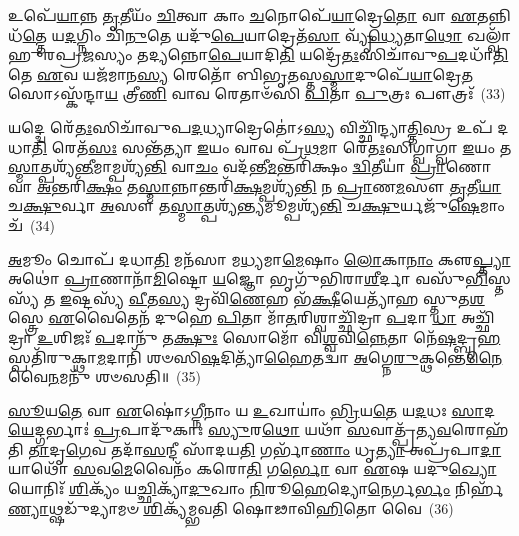 𑌉𑌪𑍇᳴\-\ul{𑌯𑌾}\-𑌨𑍍𑌨 \ul{𑌤𑍃}\-𑌤𑍀𑌯𑌂᳴ \ul{𑌚𑌿}\-𑌤𑍍𑌵𑌾 𑌕𑌾𑌂 \ul{𑌚}\-𑌨𑍋𑌪𑍇᳴\-\ul{𑌯𑌾}\-𑌦𑍍𑌰𑍇\-\ul{𑌤𑍋} 𑌵𑌾 \ul{𑌏}\-𑌤𑌨𑍍𑌨𑌿 𑌧᳴\-\ul{𑌤𑍍𑌤𑍇} 𑌯\-\ul{𑌦}\-𑌗𑍍𑌨𑌿𑌂 𑌚𑌿᳴\-\ul{𑌨𑍁}\-𑌤𑍇 𑌯𑌦𑍁᳴\-\ul{𑌪𑍇}\-𑌯𑌾𑌦𑍍𑌰𑍇𑌤᳴\-\ul{𑌸𑌾} 𑌵𑍍𑌯𑍃᳴\-\ul{𑌧𑍍𑌯𑍇}\-𑌤𑌾\-\ul{𑌥𑍋} 𑌖𑌲𑍍𑌵𑌾᳴𑌹𑍁𑌰𑌪𑍍𑌰\-\ul{𑌜}\-𑌸𑍍𑌯𑌂 𑌤𑌦𑍍𑌯𑌨𑍍𑌨𑍋\-\ul{𑌪𑍇}\-𑌯𑌾𑌦𑌿\-\ul{𑌤𑌿} 𑌯𑌦𑍍𑌰𑍇᳴\-\ul{𑌤𑌃}\-𑌸𑌿𑌚𑌾᳴𑌵𑍁\-\ul{𑌪}\-𑌦𑌧𑌾᳴\-\ul{𑌤𑌿} 𑌤𑍇 \ul{𑌏}\-𑌵 𑌯𑌜᳴𑌮𑌾𑌨\-\ul{𑌸𑍍𑌯} 𑌰𑍇𑌤𑍋᳴ 𑌬𑌿𑌭𑍃\-\ul{𑌤}\-𑌸𑍍𑌤\-\ul{𑌸𑍍𑌮𑌾}\-𑌦𑍁𑌪𑍇᳴\-\ul{𑌯𑌾}\-𑌦𑍍𑌰𑍇\-\ul{𑌤}\-𑌸𑍋\-𑌽𑌸𑍍𑌕᳴𑌨𑍍𑌦𑌾\-\ul{𑌯} 𑌤𑍍𑌰𑍀\-\ul{𑌣𑌿} 𑌵𑌾𑌵 𑌰𑍇𑌤𑌾𑍞᳴𑌸𑌿 \ul{𑌪𑌿}\-𑌤𑌾 \ul{𑌪𑍁}\-𑌤𑍍𑌰𑌃 𑌪𑍗𑌤𑍍𑌰𑌃᳴~(33)

𑌯𑌦𑍍𑌦𑍍𑌵𑍇 𑌰𑍇᳴\-\ul{𑌤𑌃}\-𑌸𑌿𑌚𑌾᳴𑌵𑍁𑌪\-\ul{𑌦}\-𑌧𑍍𑌯𑌾𑌦𑍍𑌰𑍇𑌤𑍋॑\-𑌽\-\ul{𑌸𑍍𑌯} 𑌵𑌿𑌚𑍍𑌛𑌿᳴𑌨𑍍𑌦𑍍𑌯𑌾\-\ul{𑌤𑍍𑌤𑌿}\-𑌸𑍍𑌰 𑌉𑌪᳴ 𑌦𑌧𑌾\-\ul{𑌤𑌿} 𑌰𑍇𑌤᳴\-\ul{𑌸𑌃} 𑌸𑌨𑍍𑌤᳴𑌤𑍍𑌯𑌾 \ul{𑌇}\-𑌯𑌂 𑌵𑌾𑌵 𑌪𑍍𑌰᳴\-\ul{𑌥}\-𑌮𑌾 𑌰𑍇᳴\-\ul{𑌤𑌃}\-𑌸𑌿𑌗𑍍𑌵𑌾𑌗𑍍𑌵𑌾 \ul{𑌇}\-𑌯𑌂 𑌤\-\ul{𑌸𑍍𑌮𑌾}\-𑌤𑍍𑌪𑌶𑍍𑌯᳴\-\ul{𑌨𑍍𑌤𑍀}\-𑌮𑌾𑌮𑍍𑌪𑌶𑍍𑌯᳴\-\ul{𑌨𑍍𑌤𑌿} 𑌵𑌾\-\ul{𑌚𑌂} 𑌵𑌦᳴𑌨𑍍𑌤𑍀\-\ul{𑌮}\-𑌨𑍍𑌤𑌰𑌿᳴𑌕𑍍𑌷𑌂 \ul{𑌦𑍍𑌵𑌿}\-𑌤𑍀𑌯𑌾॑ \ul{𑌪𑍍𑌰𑌾}\-𑌣𑍋 𑌵𑌾 \ul{𑌅}\-𑌨𑍍𑌤𑌰𑌿᳴\-\ul{𑌕𑍍𑌷𑌂} 𑌤\-\ul{𑌸𑍍𑌮𑌾}\-𑌨𑍍𑌨𑌾𑌨𑍍𑌤𑌰𑌿᳴\-\ul{𑌕𑍍𑌷}\-𑌮𑍍𑌪𑌶𑍍𑌯᳴\-\ul{𑌨𑍍𑌤𑌿} 𑌨 \ul{𑌪𑍍𑌰𑌾}\-𑌣\-\ul{𑌮}\-𑌸𑍗 \ul{𑌤𑍃}\-𑌤𑍀\-\ul{𑌯𑌾} 𑌚\-\ul{𑌕𑍍𑌷𑍁}\-𑌰𑍍𑌵𑌾 \ul{𑌅}\-𑌸𑍗 𑌤\-\ul{𑌸𑍍𑌮𑌾}\-𑌤𑍍𑌪𑌶𑍍𑌯᳴\-\ul{𑌨𑍍𑌤𑍍𑌯}\-𑌮𑍂𑌮𑍍𑌪𑌶𑍍𑌯᳴\-\ul{𑌨𑍍𑌤𑌿} 𑌚\-\ul{𑌕𑍍𑌷𑍁}\-𑌰𑍍𑌯𑌜𑍁᳴\-\ul{𑌷𑍇}\-𑌮𑌾𑌂 𑌚᳴~(34)

\-\ul{𑌅}\-𑌮𑍂𑌂 𑌚𑍋𑌪᳴ 𑌦𑌧𑌾\-\ul{𑌤𑌿} 𑌮𑌨᳴𑌸𑌾 𑌮\-\ul{𑌧𑍍𑌯}\-𑌮𑌾\-\ul{𑌮𑍇}\-𑌷𑌾𑌂 \ul{𑌲𑍋}\-𑌕𑌾\-\ul{𑌨𑌾𑌂} 𑌕𑍢\-\ul{𑌪𑍍𑌤𑍍𑌯𑌾} 𑌅𑌥𑍋॑ \ul{𑌪𑍍𑌰𑌾}\-𑌣𑌾𑌨𑌾᳴\-\ul{𑌮𑌿}\-𑌷𑍍𑌟𑍋 \ul{𑌯}\-𑌜𑍍𑌞𑍋 𑌭𑍃𑌗𑍁᳴𑌭𑌿𑌰𑌾\-\ul{𑌶𑍀}\-𑌰𑍍𑌦𑌾 𑌵𑌸𑍁᳴\-\ul{𑌭𑌿}\-𑌸𑍍𑌤𑌸𑍍𑌯᳴ 𑌤 \ul{𑌇}\-𑌷𑍍𑌟𑌸𑍍𑌯᳴ \ul{𑌵𑍀}\-𑌤\-\ul{𑌸𑍍𑌯} 𑌦𑍍𑌰𑌵𑌿᳴\-\ul{𑌣𑍇}\-𑌹 𑌭᳴\-\ul{𑌕𑍍𑌷𑍀}\-𑌯𑍇𑌤𑍍𑌯𑌾᳴𑌹 𑌸𑍍𑌤𑍁𑌤\-\ul{𑌶}\-𑌸𑍍𑌤𑍍𑌰𑍇 \ul{𑌏}\-𑌵𑍈𑌤𑍇𑌨᳴ 𑌦𑍁𑌹𑍇 \ul{𑌪𑌿}\-𑌤𑌾 𑌮𑌾᳴\-\ul{𑌤}\-𑌰𑌿𑌶𑍍𑌵𑌾𑌚𑍍𑌛𑌿᳴𑌦𑍍𑌰𑌾 \ul{𑌪}\-𑌦𑌾 \ul{𑌧𑌾} 𑌅𑌚𑍍𑌛𑌿᳴𑌦𑍍𑌰𑌾 \ul{𑌉}\-𑌶𑌿𑌜𑌃᳴ \ul{𑌪}\-𑌦𑌾𑌨𑍁᳴ 𑌤\-\ul{𑌕𑍍𑌷𑍁𑌃} 𑌸𑍋𑌮𑍋᳴ 𑌵𑌿\-\ul{𑌶𑍍𑌵}\-𑌵𑌿\-\ul{𑌨𑍍𑌨𑍇}\-𑌤𑌾 𑌨𑍇᳴\-\ul{𑌷}\-𑌦𑍍𑌬𑍃\-\ul{𑌹}\-𑌸𑍍𑌪𑌤𑌿᳴𑌰𑍁𑌕𑍍𑌥𑌾\-\ul{𑌮}\-𑌦𑌾𑌨𑌿᳴ 𑌶𑍞𑌸𑌿\-\ul{𑌷}\-𑌦𑌿𑌤𑍍𑌯𑌾᳴\-\ul{𑌹𑍈}\-𑌤𑌦𑍍𑌵𑌾 \ul{𑌅}\-𑌗𑍍𑌨𑍇\-\ul{𑌰𑍁}\-𑌕𑍍𑌥𑌨𑍍𑌤𑍇\-\ul{𑌨𑍈}\-𑌵𑍈\-\ul{𑌨}\-𑌮𑌨𑍁᳴ 𑌶𑍞𑌸𑌤𑌿॥~(35)

{\anuvakamend[{\-\ul{𑌮𑌿}\-\-\ul{𑌨𑍁}\-𑌯𑌾\-\ul{𑌤𑍍𑌤𑍃}\-𑌤𑍀𑌯𑌂᳴ 𑌚𑌿\-\ul{𑌨𑍍𑌵𑌾}\-𑌨𑌸𑍍𑌤𑍍𑌰𑌿\-\ul{𑌯𑌂} 𑌪𑍗𑌤𑍍𑌰᳴\-\ul{𑌶𑍍𑌚} 𑌵𑍈 \ul{𑌸}\-𑌪𑍍𑌤𑌦᳴𑌶 𑌚}]}%

\-\ul{𑌸𑍂}\-𑌯\-\ul{𑌤𑍇} 𑌵𑌾 \ul{𑌏}\-𑌷𑍋॑\-𑌽\-\ul{𑌗𑍍𑌨𑍀}\-𑌨𑌾𑌂 𑌯 \ul{𑌉}\-𑌖𑌾𑌯𑌾𑌂॑ \ul{𑌭𑍍𑌰𑌿}\-𑌯\-\ul{𑌤𑍇} 𑌯\-\ul{𑌦}\-𑌧𑌃 \ul{𑌸𑌾}\-𑌦\-\ul{𑌯𑍇}\-𑌦𑍍𑌗𑌰𑍍𑌭𑌾𑌃॑ \ul{𑌪𑍍𑌰}\-𑌪𑌾𑌦𑍁᳴𑌕𑌾𑌃 \ul{𑌸𑍍𑌯𑍁}\-𑌰\-\ul{𑌥𑍋} 𑌯𑌥𑌾᳴ \ul{𑌸}\-𑌵𑌾𑌤𑍍𑌪𑍍𑌰᳴𑌤𑍍𑌯\-\ul{𑌵}\-𑌰𑍋𑌹᳴𑌤𑌿 \ul{𑌤𑌾}\-𑌦𑍃\-\ul{𑌗𑍇}\-𑌵 𑌤𑌦𑌾᳴\-\ul{𑌸}\-𑌨𑍍𑌦𑍀 𑌸𑌾᳴𑌦𑌯\-\ul{𑌤𑌿} 𑌗𑌰𑍍𑌭𑌾᳴\-\ul{𑌣𑌾𑌂} 𑌧𑍃\-\ul{𑌤𑍍𑌯𑌾} 𑌅𑌪𑍍𑌰᳴𑌪𑌾\-\ul{𑌦𑌾}\-𑌯𑌾𑌥𑍋᳴ \ul{𑌸}\-𑌵\-\ul{𑌮𑍇}\-𑌵𑍈𑌨𑌂᳴ 𑌕𑌰𑍋\-\ul{𑌤𑌿} 𑌗\-\ul{𑌰𑍍𑌭𑍋} 𑌵𑌾 \ul{𑌏}\-𑌷 𑌯𑌦𑍁\-\ul{𑌖𑍍𑌯𑍋} 𑌯𑍋𑌨𑌿𑌃᳴ \ul{𑌶𑌿}\-𑌕𑍍𑌯𑌂᳴ 𑌯\-\ul{𑌚𑍍𑌛𑌿}\-𑌕𑍍𑌯𑌾᳴\-\ul{𑌦𑍁}\-𑌖𑌾𑌂 \ul{𑌨𑌿}\-𑌰𑍂\-\ul{𑌹𑍇}\-𑌦𑍍𑌯𑍋\-\ul{𑌨𑍇}\-𑌰𑍍𑌗\-\ul{𑌰𑍍𑌭𑌂} 𑌨𑌿𑌰𑍍\mbox{}𑌹᳴\-\ul{𑌣𑍍𑌯𑌾}\-𑌥𑍍𑌷𑌡𑍁᳴𑌦𑍍𑌯𑌾𑌮𑍞 \ul{𑌶𑌿}\-𑌕𑍍𑌯᳴𑌮𑍍𑌭𑌵𑌤𑌿 𑌷𑍋𑌢𑌾𑌵𑌿\-\ul{𑌹𑌿}\-𑌤𑍋 𑌵𑍈~(36)

